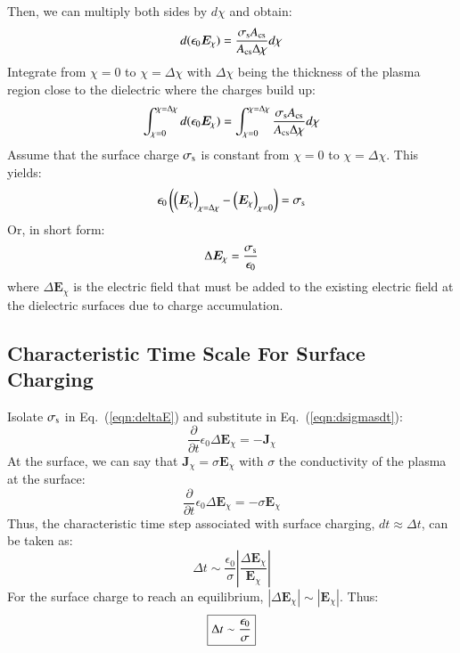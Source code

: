 \documentclass{warpdoc}
\newcommand\frameeqn[1]{\fbox{$\displaystyle #1$}}
\renewcommand{\vec}[1]{\bm{#1}}
\begin{document}
Then, we can multiply both sides by $d \chi$ and obtain:
%
\begin{equation}
  d (\epsilon_0 \vec{E}_\chi) = \frac{\sigma_{\rm s} A_{\rm cs}}{A_{\rm cs} \Delta \chi} d \chi 
\end{equation}
% 
Integrate from $\chi=0$ to $\chi=\Delta \chi$ with $\Delta \chi$ being the thickness of the plasma region close to the dielectric where the charges build up:
%
\begin{equation}
 \int_{\chi=0}^{\chi=\Delta \chi}  d(\epsilon_0 \vec{E}_\chi) = \int_{\chi=0}^{\chi=\Delta \chi} \frac{\sigma_{\rm s} A_{\rm cs}}{A_{\rm cs} \Delta \chi} d \chi 
\end{equation}
% 
Assume that the surface charge $\sigma_{\rm s}$ is constant from $\chi=0$ to $\chi=\Delta \chi$. This yields:
%
\begin{equation}
 \epsilon_0 \left( \left(\vec{E}_\chi\right)_{\chi=\Delta \chi} 
                 - \left(\vec{E}_\chi\right)_{\chi=0}\right)
  = 
 \sigma_{\rm s}  
\end{equation}
% 
Or, in short form:
%
\begin{equation}
  \Delta \vec{E}_\chi
  = 
 \frac{\sigma_{\rm s}}{\epsilon_0}  
\label{eqn:deltaE}
\end{equation}
% 
where $\Delta \vec{E}_\chi$ is the electric field that must be added to the existing electric field at the dielectric surfaces due to charge accumulation.  


\subsection{Characteristic Time Scale For Surface Charging}

Isolate $\sigma_{\rm s}$ in Eq.\ (\ref{eqn:deltaE}) and substitute in Eq.\ (\ref{eqn:dsigmasdt}):
%
\begin{equation}
  \frac{\partial}{\partial t} \epsilon_0 \Delta \vec{E}_\chi = -\vec{J}_{\chi}  
\end{equation}
%
At the surface, we can say that $\vec{J}_\chi=\sigma \vec{E}_\chi$ with $\sigma$ the conductivity of the plasma at the surface:
%
\begin{equation}
  \frac{\partial}{\partial t} \epsilon_0 \Delta \vec{E}_\chi = -\sigma \vec{E}_\chi  
\end{equation}
%
Thus, the characteristic time step associated with surface charging, $dt \approx \Delta t$, can be taken as:
%
\begin{equation}
    \Delta t \sim  \frac{ \epsilon_0}{\sigma} \left| \frac{\Delta \vec{E}_\chi}{\vec{E}_\chi}\right| 
\end{equation}
%
For the surface charge to reach an equilibrium, $|\Delta \vec{E}_\chi| \sim |\vec{E}_\chi|$. Thus:
%
\begin{equation}
\frameeqn{
    \Delta t \sim  \frac{ \epsilon_0}{\sigma}  
}
\end{equation}
%
\end{document}
